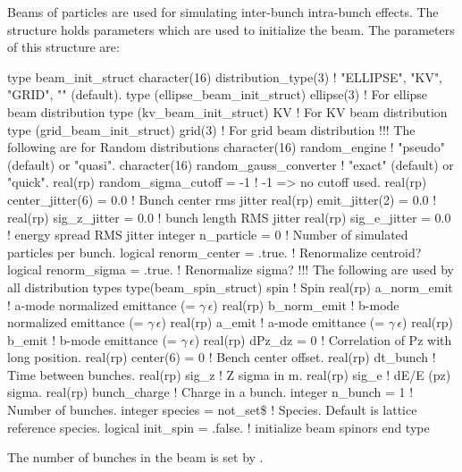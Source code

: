 Beams of particles are used for simulating inter-bunch intra-bunch effects.
The  structure holds parameters which are used to initialize
the beam. The parameters of this structure are:
\begin{example}
  type beam_init_struct
    character(16) distribution_type(3)         ! "ELLIPSE", "KV", "GRID", "" (default).
    type (ellipse_beam_init_struct) ellipse(3) ! For ellipse beam distribution
    type (kv_beam_init_struct) KV              ! For KV beam distribution
    type (grid_beam_init_struct) grid(3)       ! For grid beam distribution
    !!! The following are for Random distributions
    character(16) random_engine          ! "pseudo" (default) or "quasi". 
    character(16) random_gauss_converter ! "exact" (default) or "quick". 
    real(rp) random_sigma_cutoff = -1    ! -1 => no cutoff used.
    real(rp) center_jitter(6) = 0.0      ! Bunch center rms jitter
    real(rp) emit_jitter(2)   = 0.0      ! %
    real(rp) sig_z_jitter     = 0.0      ! bunch length RMS jitter 
    real(rp) sig_e_jitter     = 0.0      ! energy spread RMS jitter 
    integer n_particle = 0               ! Number of simulated particles per bunch.
    logical renorm_center = .true.       ! Renormalize centroid?
    logical renorm_sigma = .true.        ! Renormalize sigma?
    !!! The following are used  by all distribution types
    type(beam_spin_struct) spin          ! Spin
    real(rp) a_norm_emit                 ! a-mode normalized emittance (= \(\gamma \, \epsilon\))
    real(rp) b_norm_emit                 ! b-mode normalized emittance (= \(\gamma \, \epsilon\))
    real(rp) a_emit                      ! a-mode emittance (= \(\gamma \, \epsilon\))
    real(rp) b_emit                      ! b-mode emittance (= \(\gamma \, \epsilon\))
    real(rp) dPz_dz = 0                  ! Correlation of Pz with long position.
    real(rp) center(6) = 0               ! Bench center offset.
    real(rp) dt_bunch                    ! Time between bunches.
    real(rp) sig_z                       ! Z sigma in m.
    real(rp) sig_e                       ! dE/E (pz) sigma.
    real(rp) bunch_charge                ! Charge in a bunch.
    integer n_bunch = 1                  ! Number of bunches.
    integer species = not_set\$           ! Species. Default is lattice reference species.
    logical init_spin = .false.          ! initialize beam spinors
  end type
\end{example}
The number of bunches in the beam is set by . 
